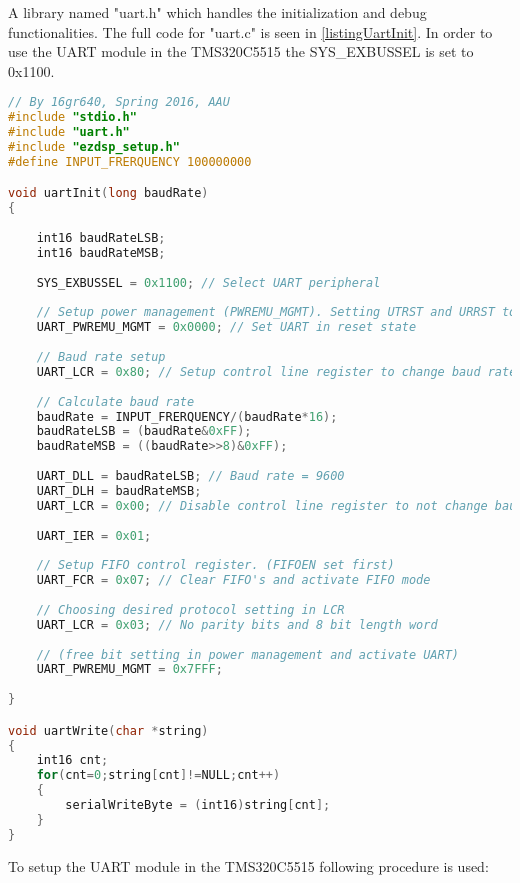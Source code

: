 A library named "uart.h" which handles the initialization and debug functionalities. The full code for "uart.c" is seen in \autoref{listingUartInit}. In order to use the UART module in the TMS320C5515 the SYS\_EXBUSSEL is set to 0x1100. 

\begin{lstlisting}[language=C, caption = {Initialization of UART},label={listingUartInit}]
// By 16gr640, Spring 2016, AAU
#include "stdio.h"
#include "uart.h"
#include "ezdsp_setup.h"
#define INPUT_FRERQUENCY 100000000

void uartInit(long baudRate)
{
	
	int16 baudRateLSB;
	int16 baudRateMSB;
	
	SYS_EXBUSSEL = 0x1100; // Select UART peripheral
	
	// Setup power management (PWREMU_MGMT). Setting UTRST and URRST to 0
	UART_PWREMU_MGMT = 0x0000; // Set UART in reset state
	
	// Baud rate setup 
	UART_LCR = 0x80; // Setup control line register to change baud rate
	
	// Calculate baud rate
	baudRate = INPUT_FRERQUENCY/(baudRate*16);
	baudRateLSB = (baudRate&0xFF);
	baudRateMSB = ((baudRate>>8)&0xFF);
	
	UART_DLL = baudRateLSB; // Baud rate = 9600
	UART_DLH = baudRateMSB;
	UART_LCR = 0x00; // Disable control line register to not change baud rate
	
	UART_IER = 0x01;
	
	// Setup FIFO control register. (FIFOEN set first) 
	UART_FCR = 0x07; // Clear FIFO's and activate FIFO mode
	
	// Choosing desired protocol setting in LCR
	UART_LCR = 0x03; // No parity bits and 8 bit length word
	
	// (free bit setting in power management and activate UART)
	UART_PWREMU_MGMT = 0x7FFF; 
	
}

void uartWrite(char *string)
{
	int16 cnt;
	for(cnt=0;string[cnt]!=NULL;cnt++)
	{
		serialWriteByte = (int16)string[cnt];
	}
}
\end{lstlisting}

To setup the UART module in the TMS320C5515 following procedure is used:

